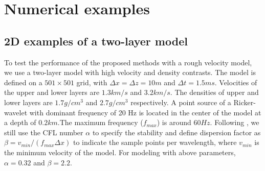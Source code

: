 \section{Numerical examples}

\subsection{2D examples of a two-layer model}

To test the performance of the proposed methods with a rough velocity model, we use a two-layer model with high velocity and density contrasts. The model is defined on a $501 \times 501$ grid, with $\Delta x=\Delta z=10 m$ and $\Delta t=1.5ms$.  Velocities of the upper and lower layers are $1.3 km/s$ and $3.2 km/s$. The densities of upper and lower layers are $1.7 g/cm^3$ and $2.7 g/cm^3$ respectively. A point source of a Ricker-wavelet with dominant frequency of 20 Hz is located in the center of the model at a depth of $0.2 km$.The maximum frequency ($f_{max}$) is around $60Hz$. Following \cite{songlfd}, we still use the CFL number $\alpha$ to specify the stability and define dispersion factor as $\beta=v_{min}/(f_{max}\Delta x)$ to indicate the sample points per wavelength, where $v_{min}$ is the minimum velocity of the model. For modeling with above parameters, $\alpha=0.32$ and $\beta=2.2$. 

\begin{comment}
Figure~\ref{fig:iwsnap,lrsnap} shows wavefield snapshot in a two-layer model with time interval of $1 ms$. Figure~\ref{fig:trace} displaces two vertical traces at a distance of $2.5 km$ selected from the wavefield snapshots shown in Figure~\ref{fig:iwsnap,lrsnap}. The top trace is calculated using a fourth-order SGFD method. The bottom trace is calculated using the SGL method proposed in this paper. Note the obvious numerical dispersion of the SGFD method. Figure~\ref{fig:lfd4snap2,lfd8snap2} shows a  wavefield snapshot generated by lowrank FD with a time interval equal to $2 ms$. At this time interval, the SGFD method becomes unstable. 


\end{comment}                              


